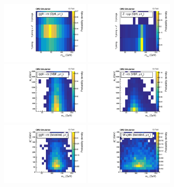 \begin{figure}[htbp]
\label{fig:htt_2Dcategories}
\centering
     \includegraphics[width=0.4\textwidth]{higgs_to_taus/plots/Figure_001-a.pdf}
     \includegraphics[width=0.4\textwidth]{higgs_to_taus/plots/Figure_001-b.pdf}\\
     \includegraphics[width=0.4\textwidth]{higgs_to_taus/plots/Figure_001-c.pdf}
     \includegraphics[width=0.4\textwidth]{higgs_to_taus/plots/Figure_001-d.pdf}\\
     \includegraphics[width=0.4\textwidth]{higgs_to_taus/plots/Figure_001-e.pdf}
     \includegraphics[width=0.4\textwidth]{higgs_to_taus/plots/Figure_001-f.pdf}

\end{figure}
